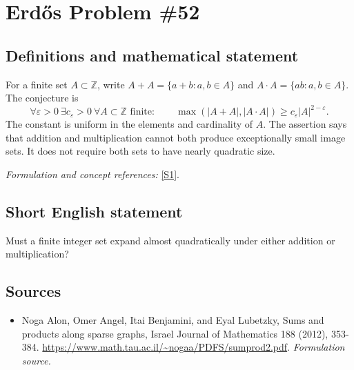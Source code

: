 \documentclass[11pt]{article}
\begin{document}
\section*{\texorpdfstring{Erdős Problem \#52}{Erdős Problem \#52}}\label{statement}
\subsection{Definitions and mathematical statement}
For a finite set $A\subset{\mathbb{Z}}$, write $A+A=\{a+b:a,b\in A\}$ and $A\cdot A=\{ab:a,b\in A\}$. The conjecture is
\[
 \forall\varepsilon>0\ \exists c_\varepsilon>0\ \forall A\subset{\mathbb{Z}}\text{ finite}:\qquad
 \max(|A+A|,|A\cdot A|)\ge c_\varepsilon|A|^{2-\varepsilon}.
\]
The constant is uniform in the elements and cardinality of $A$. The assertion says that addition and multiplication cannot both produce exceptionally small image sets. It does not require both sets to have nearly quadratic size.
\par\smallskip\textit{Formulation and concept references:} \href{https://www.math.tau.ac.il/~nogaa/PDFS/sumprod2.pdf}{[S1]}.

\subsection{Short English statement}
Must a finite integer set expand almost quadratically under either addition or multiplication?
\subsection{Sources}
\begin{itemize}
\item[S1]Noga Alon, Omer Angel, Itai Benjamini, and Eyal Lubetzky, Sums and products along sparse graphs, Israel Journal of Mathematics 188 (2012), 353-384.
\url{https://www.math.tau.ac.il/~nogaa/PDFS/sumprod2.pdf}.
\textit{Formulation source.}
\end{itemize}
\end{document}
